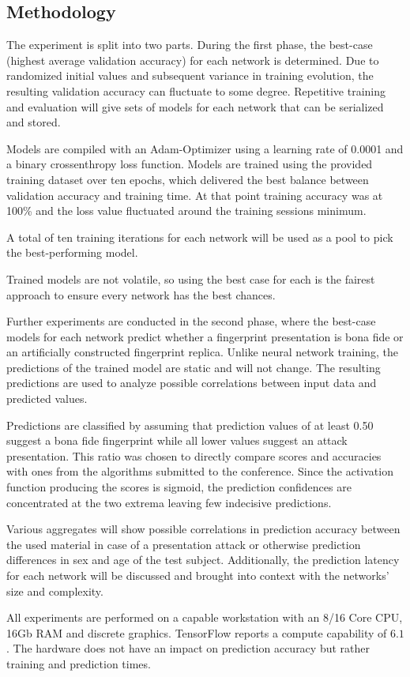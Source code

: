 


\subsection{Methodology}
The experiment is split into two parts.
During the first phase, the best-case (highest average validation accuracy) for each network is determined.
Due to randomized initial values and subsequent variance in training evolution, the resulting validation accuracy can fluctuate to some degree.
Repetitive training and evaluation will give sets of models for each network that can be serialized and stored.

Models are compiled with an Adam-Optimizer using a learning rate of 0.0001 and a binary crossenthropy loss function.
Models are trained using the provided training dataset over ten epochs, which delivered the best balance between validation accuracy and training time.
At that point training accuracy was at 100\% and the loss value fluctuated around the training sessions minimum.

A total of ten training iterations for each network will be used as a pool to pick the best-performing model.

Trained models are not volatile, so using the best case for each is the fairest approach to ensure every network has the best chances.

Further experiments are conducted in the second phase, where the best-case models for each network predict whether a fingerprint presentation is bona fide or an artificially constructed fingerprint replica.
Unlike neural network training, the predictions of the trained model are static and will not change.
The resulting predictions are used to analyze possible correlations between input data and predicted values.

Predictions are classified by assuming that prediction values of at least 0.50 suggest a bona fide fingerprint while all lower values suggest an attack presentation.
This ratio was chosen to directly compare scores and accuracies with ones from the algorithms submitted to the conference. \cite{LIVDET}
Since the activation function producing the scores is sigmoid, the prediction confidences are concentrated at the two extrema leaving few indecisive predictions.

Various aggregates will show possible correlations in prediction accuracy between the used material in case of a presentation attack or otherwise prediction differences in sex and age of the test subject.
Additionally, the prediction latency for each network will be discussed and brought into context with the networks' size and complexity.


All experiments are performed on a capable workstation with an 8/16 Core CPU, 16Gb RAM and discrete graphics.
TensorFlow reports a compute capability of $6.1$.
The hardware does not have an impact on prediction accuracy but rather training and prediction times.